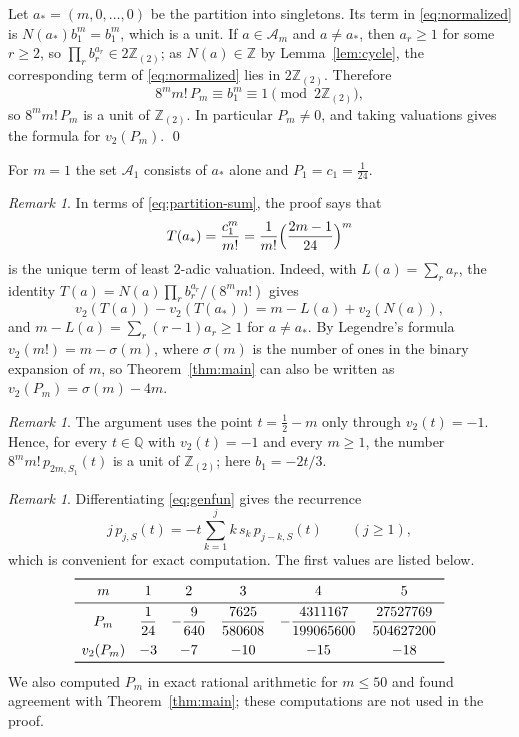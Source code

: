 \documentclass[11pt]{amsart}
\theoremstyle{definition}
\theoremstyle{remark}
\newtheorem{remark}[theorem]{Remark}
\numberwithin{equation}{section}
\newcommand{\Z}{\mathbb{Z}}
\newcommand{\Q}{\mathbb{Q}}
\newcommand{\Zt}{\Z_{(2)}}
\begin{document}
Let $a_*=(m,0,\dots,0)$ be the partition into singletons. Its term in \eqref{eq:normalized} is $N(a_*)b_1^m=b_1^m$, which is a unit. If $a\in\mathcal A_m$ and $a\ne a_*$, then $a_r\ge1$ for some $r\ge2$, so $\prod_rb_r^{a_r}\in2\Zt$; as $N(a)\in\Z$ by Lemma~\ref{lem:cycle}, the corresponding term of \eqref{eq:normalized} lies in $2\Zt$. Therefore
\[
  8^mm!\,P_m\equiv b_1^m\equiv1\pmod{2\Zt},
\]
so $8^mm!\,P_m$ is a unit of $\Zt$. In particular $P_m\ne0$, and taking valuations gives the formula for $v_2(P_m)$. \qed

For $m=1$ the set $\mathcal A_1$ consists of $a_*$ alone and $P_1=c_1=\frac1{24}$.

\begin{remark}\label{rem:separation}
In terms of \eqref{eq:partition-sum}, the proof says that
\[
  T(a_*)=\frac{c_1^m}{m!}=\frac1{m!}\Bigl(\frac{2m-1}{24}\Bigr)^m
\]
is the unique term of least $2$-adic valuation. Indeed, with $L(a)=\sum_ra_r$, the identity $T(a)=N(a)\prod_rb_r^{a_r}/(8^mm!)$ gives
\[
  v_2(T(a))-v_2(T(a_*))=m-L(a)+v_2(N(a)),
\]
and $m-L(a)=\sum_r(r-1)a_r\ge1$ for $a\ne a_*$. By Legendre's formula $v_2(m!)=m-\sigma(m)$, where $\sigma(m)$ is the number of ones in the binary expansion of $m$, so Theorem~\ref{thm:main} can also be written as $v_2(P_m)=\sigma(m)-4m$.
\end{remark}

\begin{remark}\label{rem:other-t}
The argument uses the point $t=\frac12-m$ only through $v_2(t)=-1$. Hence, for every $t\in\Q$ with $v_2(t)=-1$ and every $m\ge1$, the number $8^mm!\,p_{2m,S_1}(t)$ is a unit of $\Zt$; here $b_1=-2t/3$.
\end{remark}

\begin{remark}\label{rem:values}
Differentiating \eqref{eq:genfun} gives the recurrence
\[
  j\,p_{j,S}(t)=-t\sum_{k=1}^jk\,s_k\,p_{j-k,S}(t)\qquad(j\ge1),
\]
which is convenient for exact computation. The first values are listed below.
\[
\begin{array}{cccccc}
\toprule
m & 1 & 2 & 3 & 4 & 5\\
\midrule
P_m & \dfrac1{24} & -\dfrac9{640} & \dfrac{7625}{580608} & -\dfrac{4311167}{199065600} & \dfrac{27527769}{504627200}\\[2ex]
v_2(P_m) & -3 & -7 & -10 & -15 & -18\\
\bottomrule
\end{array}
\]
We also computed $P_m$ in exact rational arithmetic for $m\le50$ and found agreement with Theorem~\ref{thm:main}; these computations are not used in the proof.
\end{remark}
\end{document}
